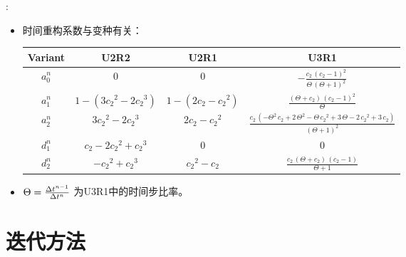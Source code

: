 \documentclass[aspectratio=169,serif]{beamer} %
\begin{document}
\begin{frame}{\secname: \subsecname}
  \begin{itemize}
    \item 时间重构系数与变种有关：
          \begin{table}[htbp]
            \centering
            \footnotesize
            \begin{tabular}{|c|c|c|c|}
              \hline
              Variant & U2R2                          & U2R1                 & U3R1                                                                                                                                   \\
              \hline
              $a^n_0$ & 0                             & 0                    & $-\frac{c_{2}\,{\left(c_{2}-1\right)}^2}{\Theta\,{\left(\Theta+1\right)}^2}$                                                           \\
              \hline
              $a^n_1$ & $1-(3{c_2}^2 - 2 {c_2}^3)$    & $1-(2c_2 - {c_2}^2)$ & $\frac{\left(\Theta+c_{2}\right)\,{\left(c_{2}-1\right)}^2}{\Theta}$                                                                   \\
              \hline
              $a^n_2$ & $3{c_2}^2 - 2 {c_2}^3$        & $2c_2 - {c_2}^2$     & $\frac{c_{2}\,\left(-\Theta^2\,c_{2}+2\,\Theta^2-\Theta\,{c_{2}}^2+3\,\Theta-2\,{c_{2}}^2+3\,c_{2}\right)}{{\left(\Theta+1\right)}^2}$ \\
              \hline
              $d^n_1$ & ${c_2} - 2 {c_2}^2 + {c_2}^3$ & 0                    & 0                                                                                                                                      \\
              \hline
              $d^n_2$ & $- {c_2}^2 + {c_2}^3$         & ${c_2}^2 - {c_2}$    & $\frac{c_{2}\,\left(\Theta+c_{2}\right)\,\left(c_{2}-1\right)}{\Theta+1}$                                                              \\
              \hline
            \end{tabular}
            \label{tab:inter0Tab}
          \end{table}
    \item $\Theta=\frac{{\Delta} t^{n-1}}{{\Delta} t^n}$ 为U3R1中的时间步比率。
  \end{itemize}
\end{frame}

\section{迭代方法}
\end{document}
